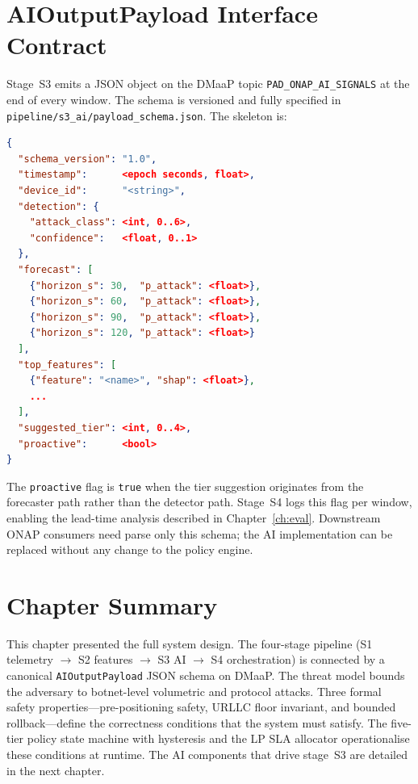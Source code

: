 \section{AIOutputPayload Interface Contract}
\label{sec:payload}

Stage~S3 emits a JSON object on the DMaaP topic
\texttt{PAD\_ONAP\_AI\_SIGNALS} at the end of every window. The schema
is versioned and fully specified in
\texttt{pipeline/s3\_ai/payload\_schema.json}. The skeleton is:

\begin{lstlisting}[language=json, caption={Skeleton of AIOutputPayload
v1. All numeric fields are rounded to 4 decimal places.}]
{
  "schema_version": "1.0",
  "timestamp":      <epoch seconds, float>,
  "device_id":      "<string>",
  "detection": {
    "attack_class": <int, 0..6>,
    "confidence":   <float, 0..1>
  },
  "forecast": [
    {"horizon_s": 30,  "p_attack": <float>},
    {"horizon_s": 60,  "p_attack": <float>},
    {"horizon_s": 90,  "p_attack": <float>},
    {"horizon_s": 120, "p_attack": <float>}
  ],
  "top_features": [
    {"feature": "<name>", "shap": <float>},
    ...
  ],
  "suggested_tier": <int, 0..4>,
  "proactive":      <bool>
}
\end{lstlisting}

The \texttt{proactive} flag is \texttt{true} when the tier suggestion
originates from the forecaster path rather than the detector path. Stage~S4
logs this flag per window, enabling the lead-time analysis described in
Chapter~\ref{ch:eval}. Downstream ONAP consumers need parse only this
schema; the AI implementation can be replaced without any change to
the policy engine.

\section{Chapter Summary}
\label{sec:system-summary}

This chapter presented the full \padonap{} system design. The four-stage
pipeline (S1 telemetry $\to$ S2 features $\to$ S3 AI $\to$ S4 orchestration)
is connected by a canonical \texttt{AIOutputPayload} JSON schema on DMaaP.
The threat model bounds the adversary to botnet-level volumetric and
protocol attacks. Three formal safety properties---pre-positioning safety,
URLLC floor invariant, and bounded rollback---define the correctness
conditions that the system must satisfy. The five-tier policy state machine
with hysteresis and the LP SLA allocator operationalise these conditions
at runtime. The AI components that drive stage~S3 are detailed in the
next chapter.
